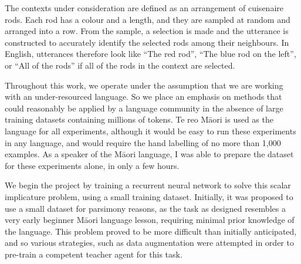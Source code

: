 The contexts under consideration are defined as an arrangement of cuisenaire rods. Each rod has a colour and a length, and they are sampled at random and arranged into a row. From the sample, a selection is made and the utterance is constructed to accurately identify the selected rods among their neighbours. In English, utterances therefore look like ``The red rod'', ``The blue rod on the left'', or ``All of the rods'' if all of the rods in the context are selected.

Throughout this work, we operate under the assumption that we are working with an under-resourced language. So we place an emphasis on methods that could reasonably be applied by a language community in the absence of large training datasets containing millions of tokens. Te reo Māori is used as the language for all experiments, although it would be easy to run these experiments in any language, and would require the hand labelling of no more than 1,000 examples. As a speaker of the Māori language, I was able to prepare the dataset for these experiments alone, in only a few hours.

We begin the project by training a recurrent neural network to solve this scalar implicature problem, using a small training dataset. Initially, it was proposed to use a small dataset for parsimony reasons, as the task as designed resembles a very early beginner Māori language lesson, requiring minimal prior knowledge of the language. This problem proved to be more difficult than initially anticipated, and so various strategies, such as data augmentation were attempted in order to pre-train a competent teacher agent for this task.
